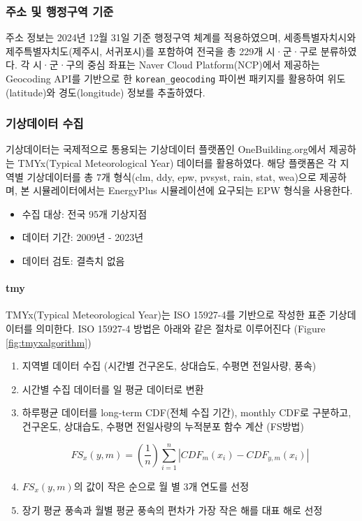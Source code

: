 \subsubsection{주소 및 행정구역 기준}
주소 정보는 2024년 12월 31일 기준 행정구역 체계를 적용하였으며, 세종특별자치시와 제주특별자치도(제주시, 서귀포시)를 포함하여 전국을 총 229개 시·군·구로 분류하였다.
각 시·군·구의 중심 좌표는 Naver Cloud Platform(NCP)에서 제공하는 Geocoding API를 기반으로 한 \texttt{korean\_geocoding} 파이썬 패키지를 활용하여 위도(latitude)와 경도(longitude) 정보를 추출하였다.

\subsubsection{기상데이터 수집}
기상데이터는 국제적으로 통용되는 기상데이터 플랫폼인 OneBuilding.org\cite{onebuilding2025}에서 제공하는 TMYx(Typical Meteorological Year) 데이터를 활용하였다. 해당 플랫폼은 각 지역별 기상데이터를 총 7개 형식(clm, ddy, epw, pvsyst, rain, stat, wea)으로 제공하며, 본 시뮬레이터에서는 EnergyPlus 시뮬레이션에 요구되는 EPW 형식을 사용한다.
\begin{itemize}
  \item 수집 대상: 전국 95개 기상지점
  \item 데이터 기간: 2009년 - 2023년
  \item 데이터 검토: 결측치 없음
\end{itemize}
\paragraph{tmy} TMYx(Typical Meteorological Year)는 ISO 15927-4를 기반으로 작성한 표준 기상데이터를 의미한다. ISO 15927-4 방법은 아래와 같은 절차로 이루어진다\cite{shimtmyx} (Figure \ref{fig:tmyxalgorithm})
\begin{enumerate}
  \item 지역별 데이터 수집 (시간별 건구온도, 상대습도, 수평면 전일사량, 풍속)
  \item 시간별 수집 데이터를 일 평균 데이터로 변환
  \item 하루평균 데이터를 long-term CDF(전체 수집 기간), monthly CDF로 구분하고, 건구온도, 상대습도, 수평면 전일사량의 누적분포 함수 계산 (FS방법)
  
\[ 
  FS_{x}(y,m) = \left(\frac{1}{n}\right) \sum_{i=1}^{n} |CDF_{m}(x_{i}) - CDF_{y,m}(x_{i})|
\]

  \item $FS_{x}(y,m)$의 값이 작은 순으로 월 별 3개 연도를 선정
  \item 장기 평균 풍속과 월별 평균 풍속의 편차가 가장 작은 해를 대표 해로 선정
\end{enumerate}

